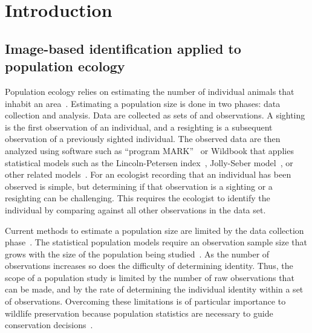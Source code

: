 \begin{comment}
    ./texfix.py --outline --fpaths chapter1-intro.tex

    fixtex --fpaths chapter1-intro.tex --outline --asmarkdown --numlines=999 --shortcite -w && ./checklang.py outline_chapter1-intro.md

    ./texfix.py --grep "\\\\[A-Za-z]*[^{a-zA-Z]"
    ./texfix.py --reformat --fpaths figdef1.tex
\end{comment}


\chapter{Introduction}\label{chap:intro}

\section{Image-based identification applied to population ecology}

    Population ecology relies on estimating the number of individual animals that inhabit an
      area~\cite{krebs_ecological_1999}.
    Estimating a population size is done in two phases:
    data collection and analysis.
    Data are collected as sets of  and  observations.
    A sighting is the first observation of an individual, and a resighting is a subsequent observation of a
      previously sighted individual.
    The observed data are then analyzed using software such as ``program MARK''~\cite{white_program_1999,
      schwarz_jolly_seber_2006} or Wildbook that applies statistical models such as the Lincoln-Petersen
      index~\cite{seber_estimation_1982}, Jolly-Seber model~\cite{jolly_explicit_1965, seber_note_1965}, or other
      related models~\cite{cormack_estimates_1964, chao_estimating_1987,kenneth._h._pollock_statistical_1990}.
    For an ecologist recording that an individual has been observed is simple, but determining if that
      observation is a sighting or a resighting can be challenging.
    This requires the ecologist to identify the individual by comparing against all other observations in the
      data set.

    Current methods to estimate a population size are limited by the data collection
    phase~\cite{sundaresan_network_2007, rubenstein_ecology_2010}. The statistical population models require an
    observation sample size that grows with the size of the population being studied~\cite{seber_estimation_1982}.
    As the number of observations increases so does the difficulty of determining identity. Thus, the scope of a
    population study is limited by the number of raw observations that can be made, and by the rate of determining
    the individual identity within a set of observations. Overcoming these limitations is of particular importance
    to wildlife preservation because population statistics are necessary to guide conservation
    decisions~\cite{rubenstein_behavioral_1998}.

